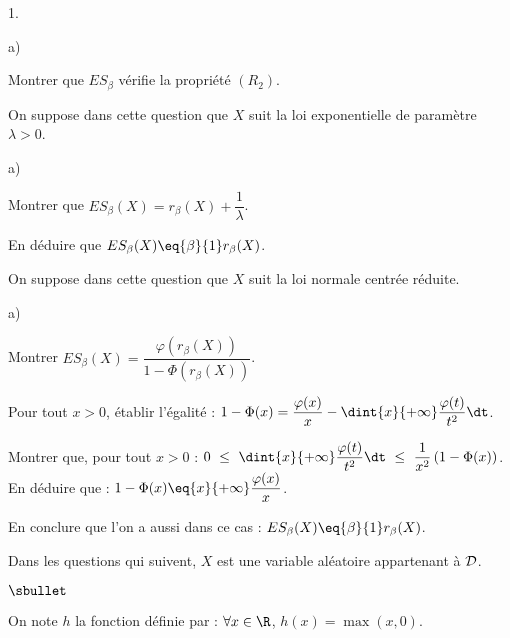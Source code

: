 \begin{noliste}{1.}
\begin{noliste}{a)}
    

    
    \item Montrer que $ES_\beta$ vérifie la propriété $(R_2)$.
    
    
  \end{noliste}
  
  \item On suppose dans cette question que $X$ suit la loi 
  exponentielle de paramètre $\lambda>0$.
  \begin{noliste}{a)}
    \setlength{\itemsep}{2mm}
    \item Montrer que $ES_\beta(X)=r_\beta(X)+\dfrac{1}{\lambda}$.
    
    

    
    \item En déduire que $ES_\beta(X) \eq{\beta}{1} r_\beta(X)$.
    
    
  \end{noliste}
  
  
  
  
  
  
  \item On suppose dans cette question que $X$ suit la loi normale 
  centrée réduite.
  \begin{noliste}{a)}
    \setlength{\itemsep}{2mm}
    \item Montrer $ES_\beta(X) = 
    \dfrac{\varphi(r_\beta(X))}{1-\Phi(r_\beta(X))}$.
    
    
    
    \item Pour tout $x >0$, établir l'égalité : $1-\Phi(x)=
    \dfrac{\varphi(x)}{x}-\dint{x}{+\infty} \dfrac{\varphi(t)}{t^2} 
    \dt$.
    
    

    \item Montrer que, pour tout $x>0$ : $0 \ \leq \ \dint{x}{+\infty}  
    \dfrac{\varphi(t)}{t^2} \dt \ \leq \ \dfrac{1}{x^2}\, 
    (1-\Phi(x))$.\\
    En déduire que : $1-\Phi(x) \eq{x}{+\infty} 
    \dfrac{\varphi(x)}{x}$.
    
    

    
    \item En conclure que l'on a aussi dans ce cas : $ES_\beta(X) 
    \eq{\beta}{1} r_\beta(X)$.
    
    
  \end{noliste}
  Dans les questions qui suivent, $X$ est une variable aléatoire 
  appartenant à ${\cal D}$.
  \begin{noliste}{$\sbullet$}
    \item On note $h$ la fonction définie par : $\forall x 
    \in \R$, $h(x)=\max(x,0)$.
    

\end{noliste}
\end{noliste}
